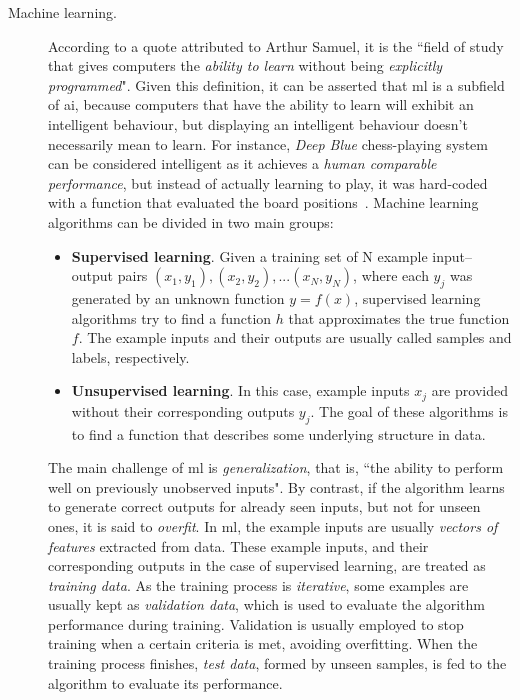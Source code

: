 \begin{description}
	\item[Machine learning.] According to a quote attributed to Arthur Samuel, it is the ``field of study that gives computers the \emph{ability to learn} without being \emph{explicitly programmed}"\cite{ml-def}. Given this definition, it can be asserted that \gls{ml} is a subfield of \gls{ai}, because computers that have the ability to learn will exhibit an intelligent behaviour, but displaying an intelligent behaviour doesn't necessarily mean to learn. For instance, \emph{Deep Blue} chess-playing system can be considered intelligent as it achieves a \emph{human comparable performance}, but instead of actually learning to play, it was hard-coded with a function that evaluated the board positions~\cite{Goodfellow-et-al-2016}. Machine learning algorithms can be divided in two main groups:
	\begin{itemize}
		\item \textbf{Supervised learning}. Given a training set of N example input–output pairs $(x_1, y_1),(x_2, y_2), . . .(x_N, y_N)$, where each $y_j$ was generated by an unknown function $y = f(x)$, supervised learning algorithms try to find a function $h$ that approximates the true function $f$\cite{Russell:2003:AIM:773294}. The example inputs and their outputs are usually called samples and labels, respectively.
		\item \textbf{Unsupervised learning}. In this case, example inputs $x_j$ are provided without their corresponding outputs $y_j$. The goal of these algorithms is to find a function that describes some underlying structure in data\cite{unsup}. 
	\end{itemize}
	The main challenge of \gls{ml} is \emph{generalization}, that is, ``the ability to perform well on previously unobserved inputs"\cite{Goodfellow-et-al-2016}. By contrast, if the algorithm learns to generate correct outputs for already seen inputs, but not for unseen ones, it is said to \emph{overfit}. In \gls{ml}, the example inputs are usually \emph{vectors of features} extracted from data. These example inputs, and their corresponding outputs in the case of supervised learning, are treated as \emph{training data}. As the training process is \emph{iterative}, some examples are usually kept as \emph{validation data}, which is used to evaluate the algorithm performance during training. Validation is usually employed to stop training when a certain criteria is met, avoiding overfitting. When the training process finishes, \emph{test data}, formed by unseen samples, is fed to the algorithm to evaluate its performance.
\end{description}
